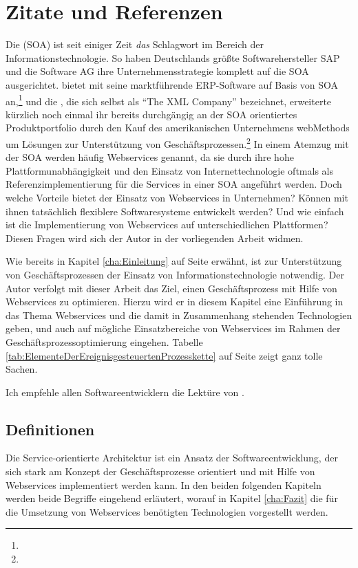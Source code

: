 \chapter{Zitate und Referenzen}
\label{cha:ZitateReferenzen}

Die  (SOA) ist seit einiger Zeit \textit{das} Schlagwort im Bereich der Informationstechnologie. So haben \zB Deutschlands größte Softwarehersteller SAP und die Software AG ihre Unternehmensstrategie komplett auf die SOA ausgerichtet.  bietet mit  seine marktführende ERP-Software auf Basis von SOA an,\footnote{\Vgl{}} und die , die sich selbst als "`The XML Company"' bezeichnet, erweiterte kürzlich noch einmal ihr bereits durchgängig an der SOA orientiertes Produktportfolio durch den Kauf des amerikanischen Unternehmens webMethods um Lösungen zur Unterstützung von Geschäftsprozessen.\footnote{\Vgl{}} In einem Atemzug mit der SOA werden häufig Webservices genannt, da sie durch ihre hohe Plattformunabhängigkeit und den Einsatz von Internettechnologie oftmals als Referenzimplementierung für die Services in einer SOA angeführt werden. Doch welche Vorteile bietet der Einsatz von Webservices in Unternehmen? Können mit ihnen tatsächlich flexiblere Softwaresysteme entwickelt werden? Und wie einfach ist die Implementierung von Webservices auf unterschiedlichen Plattformen? Diesen Fragen wird sich der Autor in der vorliegenden Arbeit widmen.

Wie bereits in Kapitel \ref{cha:Einleitung} auf Seite \pageref{cha:Einleitung} erwähnt, ist zur Unterstützung von Geschäftsprozessen der Einsatz von Informationstechnologie notwendig. Der Autor verfolgt mit dieser Arbeit das Ziel, einen Geschäftsprozess  mit Hilfe von Webservices zu optimieren. Hierzu wird er in diesem Kapitel eine Einführung in das Thema Webservices und die damit in Zusammenhang stehenden Technologien geben, und auch auf mögliche Einsatzbereiche von Webservices im Rahmen der Geschäftsprozessoptimierung eingehen. Tabelle \ref{tab:ElementeDerEreignisgesteuertenProzesskette} auf Seite \pageref{tab:ElementeDerEreignisgesteuertenProzesskette} zeigt ganz tolle Sachen.

Ich empfehle allen Softwareentwicklern die Lektüre von .

\section{Definitionen}
Die Service-orientierte Architektur ist ein Ansatz der Softwareentwicklung, der sich stark am Konzept der Geschäftsprozesse orientiert und mit Hilfe von Webservices implementiert werden kann. In den beiden folgenden Kapiteln werden beide Begriffe eingehend erläutert, worauf in Kapitel \ref{cha:Fazit} die für die Umsetzung von Webservices benötigten Technologien vorgestellt werden.

